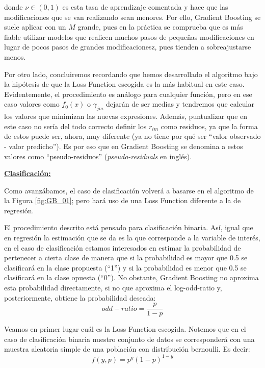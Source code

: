 \documentclass[12pt,twoside]{article}
\begin{document}
\noindent
donde $\nu \in (0, 1)$ es esta tasa de aprendizaje comentada y hace que las modificaciones que se van realizando sean menores. Por ello, Gradient Boosting se suele aplicar con un $M$ grande, pues en la práctica se comprueba que es más fiable utilizar modelos que realicen muchos pasos de pequeñas modificaciones en lugar de pocos pasos de grandes modificacionesz, pues tienden a sobreajustarse menos.

Por otro lado, concluiremos recordando que hemos desarrollado el algoritmo bajo la hipótesis de que la Loss Function escogida es la más habitual en este caso. Evidentemente, el procedimiento es análogo para cualquier función, pero en ese caso valores como $f_0(x)$ o $\gamma_{jm}$ dejarán de ser medias y tendremos que calcular los valores que minimizan las nuevas expresiones. Además, puntualizar que en este caso no sería del todo correcto definir los $r_{im}$ como residuos, ya que la forma de estos puede ser, ahora, muy diferente (ya no tiene por qué ser ``valor observado - valor predicho''). Es por eso que en Gradient Boosting se denomina a estos valores como ``pseudo-residuos'' (\textit{pseudo-residuals} en inglés).



\bigskip \bigskip \bigskip

\textbf{\underline{Clasificación: }}

Como avanzábamos, el caso de clasificación volverá a basarse en el algoritmo de la Figura \ref{fig:GB_01}; pero hará uso de una Loss Function diferente a la de regresión.

El procedimiento descrito está pensado para clasificación binaria. Así, igual que en regresión la estimación que se da es la que corresponde a la variable de interés, en el caso de clasificación estamos interesados en estimar la probabilidad de pertenecer a cierta clase de manera que si la probabilidad es mayor que 0.5 se clasificará en la clase propuesta (``1'') y si la probabilidad es menor que 0.5 se clasificará en la clase opuesta (``0''). No obstante, Gradient Boosting no aproxima esta probabilidad directamente, si no que aproxima el log-odd-ratio y, posteriormente, obtiene la probabilidad deseada:
\begin{equation*}
odd-ratio = \frac{p}{1-p}
\end{equation*}

Veamos en primer lugar cuál es la Loss Function escogida. Notemos que en el caso de clasificación binaria nuestro conjunto de datos se corresponderá con una muestra aleatoria simple de una población con distribución bernoulli. Es decir:
\begin{equation*}
f(y, p) = p^y(1-p)^{1-y}
\end{equation*}
\end{document}
